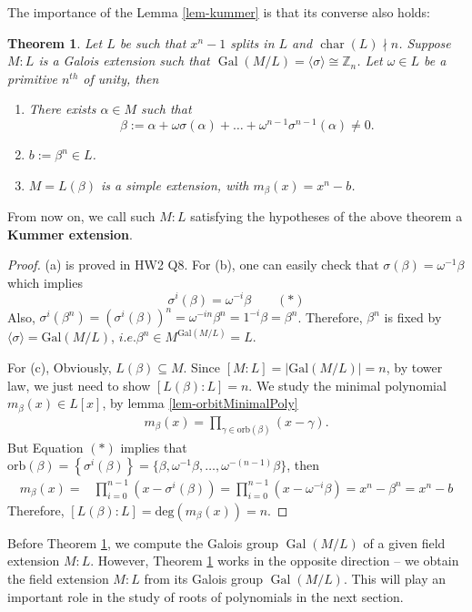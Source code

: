 \documentclass[11pt]{book}
\newtheorem{theorem}{Theorem}[section]
\begin{document}
The importance of the Lemma \ref{lem-kummer} is that its converse also holds:
\begin{theorem}\label{thm-cyclicGalImpliesKummerExtension}
    Let $L$ be such that $x^n-1$ splits in $L$ and $\operatorname{char}(L)\nmid n$. Suppose  $M:L$ is a Galois extension such that $\operatorname{Gal}(M/L) = \langle \sigma \rangle \cong \mathbb{Z}_n$. Let $\omega \in L$ be a primitive $n^{th}$ of unity, then
\begin{enumerate}
    \item[(a)] There exists $\alpha \in M$ such that
    $$\beta := \alpha + \omega\sigma(\alpha) + \dots + \omega^{n-1}\sigma^{n-1}(\alpha) \neq 0.$$
    \item[(b)] $b := \beta^n \in L$.
    \item[(c)] $M = L(\beta)$ is a simple extension, with $m_{\beta}(x) = x^n - b$.
\end{enumerate}
\end{theorem}
From now on, we call such $M:L$ satisfying the hypotheses of the above theorem a {\bf Kummer extension}.
\begin{proof}
    (a) is proved in HW2 Q8. For (b), one can easily check that \(\sigma(\beta) = \omega^{-1} \beta \) which implies
    \begin{equation*}
        \sigma^i(\beta) = \omega^{-i} \beta     \quad \quad (*)
    \end{equation*}
    Also, \(\sigma^i(\beta^n) = \left(\sigma^i(\beta)\right)^n = \omega^{-in} \beta^n = 1^{-i}\beta = \beta^n\). Therefore, \(\beta^n\) is fixed by \(\langle \sigma \rangle = \mathrm{Gal}(M/L)\), \(i.e. \beta^n \in M^{\mathrm{Gal}(M/L)} = L.\)

    For (c), Obviously, \(L(\beta) \subseteq M\). Since \([M:L] = |\mathrm{Gal}(M/L)| = n\), by tower law, we just need to show \(\left[L(\beta):L\right]=n\). We study the minimal polynomial \(m_\beta(x) \in L[x]\), by lemma \ref{lem-orbitMinimalPoly}
    \begin{align*}
        m_\beta(x) = \prod_{\gamma \in \mathrm{orb}(\beta)} (x- \gamma).
    \end{align*}
    But Equation $(*)$ implies that \(\mathrm{orb}(\beta) = \left\{\sigma^i(\beta)\right\} = \{\beta, \omega^{-1}\beta, \dots, \omega^{-(n-1)}\beta\}\), then
    \begin{align*}
        m_{\beta}(x) =& \prod_{i=0}^{n-1}\left(x - \sigma^{i}(\beta)\right) = \prod_{i=0}^{n-1}(x-\omega^{-i}\beta) =x^n - \beta^n = x^n - b
    \end{align*}
    Therefore, \([L(\beta):L] = \mathrm{deg}\left(m_\beta(x)\right) = n\).
\end{proof}
Before Theorem \ref{thm-cyclicGalImpliesKummerExtension}, we compute the Galois group $\operatorname{Gal}(M/L)$ of a given field extension $M:L$. However, Theorem \ref{thm-cyclicGalImpliesKummerExtension} works in the opposite direction -- we obtain the field extension $M:L$ from its Galois group $\operatorname{Gal}(M/L)$. This will play an important role in the study of roots of polynomials in the next section.
\end{document}
